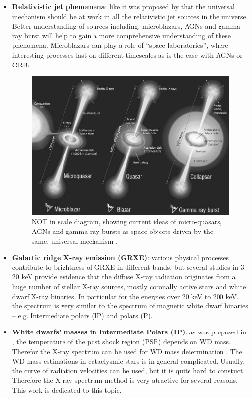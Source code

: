\documentclass[oneside,a4paper,11pt]{report}
\begin{document}
\begin{itemize}
 \item \textbf{Relativistic jet phenomena}: like it was proposed by \citet{mirabel:1} that the universal 
mechanism should be at work in all the relativistic jet sources in the universe. Better understanding 
of sources including: microblazars, AGNs and gamma-ray burst will help to gain a more comprehensive 
understanding of these phenomena. Microblazars can play a role of “space laboratories”, where interesting
 processes last on different timescales as is the case with AGNs or GRBs.   

\begin{figure}[!hbt]
\centering
\includegraphics[totalheight=8.5cm]{microblazars}
\caption{NOT in scale diagram, showing current ideas of micro-quasars, AGNs and gamma-ray
bursts as space objects driven by the same, universal mechanism  \citet{mirabel:1}. }
\label{microblazar} 
\end{figure}

 \item \textbf{Galactic ridge X-ray emission (GRXE)}: various physical processes contribute to 
brightness of GRXE in different bands, but several studies in 3-20 keV provide evidence that the diffuse 
X-ray radiation originates from a huge number of stellar X-ray sources, mostly coronally active stars
 and white dwarf X-ray binaries. In particular for the energies over 20 keV to 200 keV, the spectrum is
very similar to the spectrum of magnetic white dwarf binaries – e.g. Intermediate polars (IP) and polars (P).  
\citet{2007A&A...463..957K}
 
 \item \textbf{White dwarfs' masses in Intermediate Polars (IP)}: as was proposed in \citet{1981ApJ...250..723R}, 
the temperature of the post shock region (PSR) depends on WD mass. Therefor the X-ray spectrum can be 
used for WD mass determination \citet{2005A&A...435..191S}. The WD mass estimations in cataclysmic stars 
is in general complicated. Usually, the curve of radiation velocities can be used, but it is quite hard to constuct. 
Therefore the X-ray spectrum method is very atractive for several reasons. This work is dedicated to this topic.  

\end{itemize}
\end{document}
